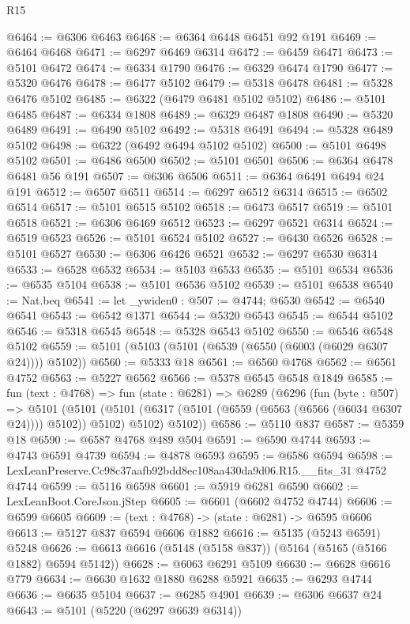 \begin{lexlean}{R15}
\begin{coremodule}
{{{{{{{{{{{@6464 := @6306 @6463
@6468 := @6364 @6448 @6451 @92 @191
@6469 := @6464 @6468
@6471 := @6297 @6469 @6314
@6472 := @6459 @6471
@6473 := @5101 @6472
@6474 := @6334 @1790
@6476 := @6329 @6474 @1790
@6477 := @5320 @6476
@6478 := @6477 @5102
@6479 := @5318 @6478
@6481 := @5328 @6476 @5102
@6485 := @6322 (@6479 @6481 @5102 @5102)
@6486 := @5101 @6485
@6487 := @6334 @1808
@6489 := @6329 @6487 @1808
@6490 := @5320 @6489
@6491 := @6490 @5102
@6492 := @5318 @6491
@6494 := @5328 @6489 @5102
@6498 := @6322 (@6492 @6494 @5102 @5102)
@6500 := @5101 @6498 @5102
@6501 := @6486 @6500
@6502 := @5101 @6501
@6506 := @6364 @6478 @6481 @56 @191
@6507 := @6306 @6506
@6511 := @6364 @6491 @6494 @24 @191
@6512 := @6507 @6511
@6514 := @6297 @6512 @6314
@6515 := @6502 @6514
@6517 := @5101 @6515 @5102
@6518 := @6473 @6517
@6519 := @5101 @6518
@6521 := @6306 @6469 @6512
@6523 := @6297 @6521 @6314
@6524 := @6519 @6523
@6526 := @5101 @6524 @5102
@6527 := @6430 @6526
@6528 := @5101 @6527
@6530 := @6306 @6426 @6521
@6532 := @6297 @6530 @6314
@6533 := @6528 @6532
@6534 := @5103 @6533
@6535 := @5101 @6534
@6536 := @6535 @5104
@6538 := @5101 @6536 @5102
@6539 := @5101 @6538
@6540 := Nat.beq
@6541 := let _ywiden0 : @507 := @4744; @6530
@6542 := @6540 @6541
@6543 := @6542 @1371
@6544 := @5320 @6543
@6545 := @6544 @5102
@6546 := @5318 @6545
@6548 := @5328 @6543 @5102
@6550 := @6546 @6548 @5102
@6559 := @5101 (@5103 (@5101 (@6539 (@6550 (@6003 (@6029 @6307 @24)))) @5102))
@6560 := @5333 @18
@6561 := @6560 @4768
@6562 := @6561 @4752
@6563 := @5227 @6562
@6566 := @5378 @6545 @6548 @1849
@6585 := fun (text : @4768) =>
  fun (state : @6281) =>
  @6289
    (@6296
      (fun (byte : @507) =>
      @5101
        (@5101 (@5101 (@6317 (@5101 (@6559 (@6563 (@6566 (@6034 @6307 @24)))) @5102)) @5102) @5102)
        @5102))
@6586 := @5110 @837
@6587 := @5359 @18
@6590 := @6587 @4768 @489 @504
@6591 := @6590 @4744
@6593 := @4743 @6591 @4739
@6594 := @4878 @6593
@6595 := @6586 @6594
@6598 := LexLeanPreserve.Cc98c37aafb92bdd8ec108aa430da9d06.R15.__fits_31 @4752 @4744
@6599 := @5116 @6598
@6601 := @5919 @6281 @6590
@6602 := LexLeanBoot.CoreJson.jStep
@6605 := @6601 (@6602 @4752 @4744)
@6606 := @6599 @6605
@6609 := (text : @4768) -> (state : @6281) -> @6595 @6606
@6613 := @5127 @837 @6594 @6606 @1882
@6616 := @5135 (@5243 @6591) @5248
@6626 := @6613 @6616 (@5148 (@5158 @837)) (@5164 (@5165 (@5166 @1882) @6594 @5142))
@6628 := @6063 @6291 @5109
@6630 := @6628 @6616 @779
@6634 := @6630 @1632 @1880 @6288 @5921
@6635 := @6293 @4744
@6636 := @6635 @5104
@6637 := @6285 @4901
@6639 := @6306 @6637 @24
@6643 := @5101 (@5220 (@6297 @6639 @6314))
}}}}}}}}}}}
\end{coremodule}
\end{lexlean}
